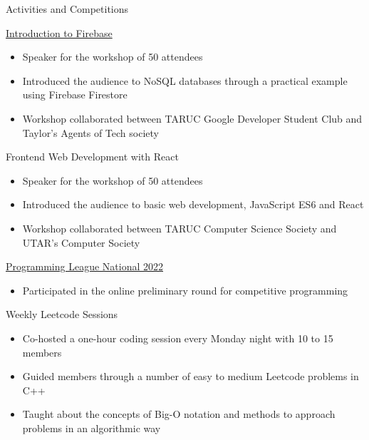 \documentclass{article}
\newlength{\tabin}
\newlength{\secsep}
\newcommand{\lineunder}{\vspace*{-8pt} \\ \hspace*{-6pt} \hrulefill \\ \vspace*{-15pt}}
\newenvironment{tabbedsection}[1]{
  \begin{list}{}{
      \setlength{\itemsep}{0pt}
      \setlength{\labelsep}{0pt}
      \setlength{\labelwidth}{0pt}
      \setlength{\leftmargin}{\tabin}
      \setlength{\rightmargin}{\tabin}
      \setlength{\listparindent}{0pt}
      \setlength{\parsep}{0pt}
      \setlength{\parskip}{0pt}
      \setlength{\partopsep}{0pt}
      \setlength{\topsep}{#1}
    }
  \item[]
}{\end{list}}
\newenvironment{resume_section}[1]{
  \filbreak
  \vspace{2\secsep}
  \textsc{\large#1}
  \lineunder
  \begin{tabbedsection}{\secsep}
}{\end{tabbedsection}}
\newenvironment{resume_subsection}[2][]{
  \textbf{#2} \hfill {\footnotesize #1} \hspace{2em}
  \begin{tabbedsection}{0.5\secsep}
}{\end{tabbedsection}}
\newenvironment{subitems}{
  \renewcommand{\labelitemi}{-}
  \begin{itemize}
      \setlength{\labelsep}{1em}
}{\end{itemize}}
\begin{document}
\begin{resume_section}{Activities and Competitions}
  \begin{resume_subsection}[(May 2022)]{\href{https://www.youtube.com/watch?v=42n0z_U8jOs}{Introduction to Firebase}}
    \begin{subitems}
      \item Speaker for the workshop of 50 attendees
      \item Introduced the audience to NoSQL databases through a practical example using Firebase Firestore
      \item Workshop collaborated between TARUC Google Developer Student Club and Taylor's Agents of Tech society
    \end{subitems}
  \end{resume_subsection}

  \begin{resume_subsection}[(April 2022)]{{Frontend Web Development with React}}
    \begin{subitems}
      \item Speaker for the workshop of 50 attendees
      \item Introduced the audience to basic web development, JavaScript ES6 and React
      \item Workshop collaborated between TARUC Computer Science Society and UTAR's Computer Society
    \end{subitems}
  \end{resume_subsection}

  \begin{resume_subsection}[(April 2022)]{\href{https://drive.google.com/file/d/1WbO1FLOikfg-FQo-d5HuY8PkBBOHJtk-/view?usp=sharing}{Programming League National 2022}}
    \begin{subitems}
      \item Participated in the online preliminary round for competitive programming
    \end{subitems}
  \end{resume_subsection}
  
    \begin{resume_subsection}{{Weekly Leetcode Sessions}}
    \begin{subitems}
      \item Co-hosted a one-hour coding session every Monday night with 10 to 15 members
      \item Guided members through a number of easy to medium Leetcode problems in C++
      \item Taught about the concepts of Big-O notation and methods to approach problems in an algorithmic way
    \end{subitems}
  \end{resume_subsection}
  

\end{resume_section}
\end{document}
